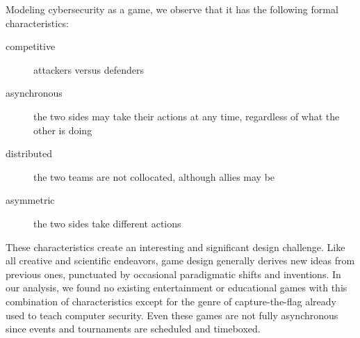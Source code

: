 \documentclass[letterpaper]{article}
\begin{document}
Modeling cybersecurity as a game, we observe that it has the
following formal characteristics:
\begin{description}
\item[competitive] attackers versus defenders
\item[asynchronous]  the two sides may take their actions at any time,
 regardless of what the other is doing
\item[distributed] the two teams are not collocated, although
 allies may be
\item[asymmetric] the two sides take different actions
\end{description}
These characteristics create an interesting and significant design challenge.
Like all creative and scientific endeavors,  game design generally
derives new ideas from previous ones, punctuated by occasional
paradigmatic shifts and inventions. In our analysis, we found
no existing entertainment or educational games with this combination
of characteristics except for the genre of capture-the-flag already
used to teach computer security. Even these games are not fully asynchronous
since events and tournaments are scheduled and timeboxed.
\end{document}

